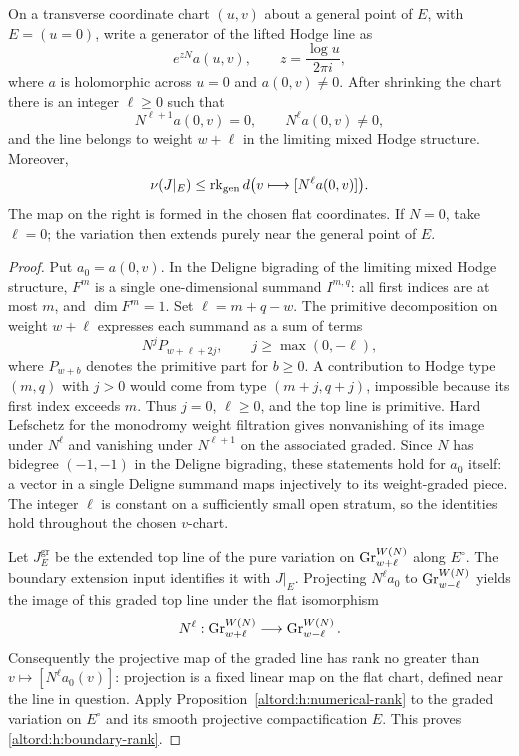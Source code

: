\begin{proposition}\label{altord:h:boundary-line}
On a transverse coordinate chart $(u,v)$ about a general point of $E$,
with $E=(u=0)$, write a generator of the lifted Hodge line as
\begin{equation}\label{altord:h:nilpotent-expression}
 e^{zN}a(u,v),\qquad z=\frac{\log u}{2\pi i},
\end{equation}
where $a$ is holomorphic across $u=0$ and $a(0,v)\ne0$.
After shrinking the chart there is an integer $\ell\ge0$ such that
\begin{equation}\label{altord:h:primitive-line}
 N^{\ell+1}a(0,v)=0,\qquad N^\ell a(0,v)\ne0,
\end{equation}
and the line belongs to weight $w+\ell$ in the limiting mixed Hodge
structure. Moreover,
\begin{equation}\label{altord:h:boundary-rank}
 \nu(J|_E)\le
 \operatorname{rk}_{\mathrm{gen}}d\bigl(v\longmapsto[N^\ell a(0,v)]\bigr).
\end{equation}
The map on the right is formed in the chosen flat coordinates.
If $N=0$, take $\ell=0$; the variation then extends purely near the
general point of $E$.
\end{proposition}

\begin{proof}
Put $a_0=a(0,v)$. In the Deligne bigrading of the limiting mixed
Hodge structure, $F^m$ is a single one-dimensional summand $I^{m,q}$:
all first indices are at most $m$, and $\dim F^m=1$.
Set $\ell=m+q-w$. The primitive decomposition on weight $w+\ell$
expresses each summand as a sum of terms
\[
 N^j P_{w+\ell+2j},\qquad j\ge\max(0,-\ell),
\]
where $P_{w+b}$ denotes the primitive part for $b\ge0$.
A contribution to Hodge type $(m,q)$ with $j>0$ would come from
type $(m+j,q+j)$, impossible because its first index exceeds $m$.
Thus $j=0$, $\ell\ge0$, and the top line is primitive.
Hard Lefschetz for the monodromy weight filtration gives nonvanishing
of its image under $N^\ell$ and vanishing under $N^{\ell+1}$ on the
associated graded. Since $N$ has bidegree $(-1,-1)$ in the Deligne
bigrading, these statements hold for $a_0$ itself: a vector in a single
Deligne summand maps injectively to its weight-graded piece.
The integer $\ell$ is constant on a sufficiently small open stratum,
so the identities hold throughout the chosen $v$-chart.

Let $J_E^{\mathrm{gr}}$ be the extended top line of the pure variation
on $\operatorname{Gr}^{W(N)}_{w+\ell}$ along $E^\circ$.
The boundary extension input identifies it with $J|_E$.
Projecting $N^\ell a_0$ to $\operatorname{Gr}^{W(N)}_{w-\ell}$ yields the image
of this graded top line under the flat isomorphism
\[
 N^\ell:\operatorname{Gr}^{W(N)}_{w+\ell}\longrightarrow
          \operatorname{Gr}^{W(N)}_{w-\ell}.
\]
Consequently the projective map of the graded line has rank no greater
than $v\mapsto[N^\ell a_0(v)]$: projection is a fixed linear map on
the flat chart, defined near the line in question.
Apply Proposition~\ref{altord:h:numerical-rank} to the graded variation on
$E^\circ$ and its smooth projective compactification $E$.
This proves \eqref{altord:h:boundary-rank}.
\end{proof}

